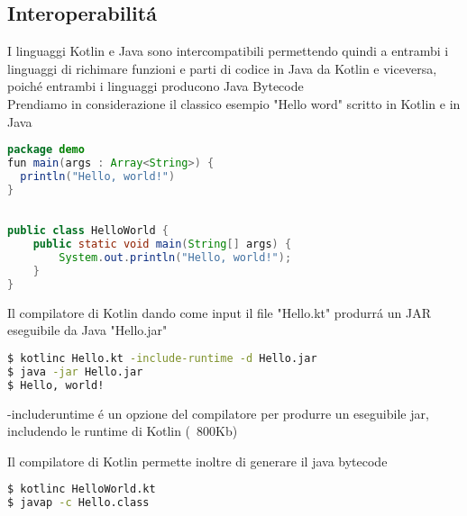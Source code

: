 

\subsection{Interoperabilit\'a}
I linguaggi Kotlin e Java sono intercompatibili permettendo quindi a entrambi i linguaggi di richimare funzioni e parti di codice in Java da Kotlin e viceversa, poich\'e entrambi i linguaggi producono Java Bytecode\\


Prendiamo in considerazione il classico esempio "Hello word" scritto in Kotlin e in Java

\begin{lstlisting}[language=java,caption={Hello.kt in Kotlin}]
package demo
fun main(args : Array<String>) {
  println("Hello, world!")
}
\end{lstlisting}

\begin{lstlisting}[language=java,caption={Hello.java in Java}]

public class HelloWorld {
    public static void main(String[] args) {
        System.out.println("Hello, world!");
    }
}
\end{lstlisting}

Il compilatore di Kotlin dando come input il file "Hello.kt" produrr\'a un JAR eseguibile da Java "Hello.jar"


\begin{lstlisting}[language=bash,caption={Compilatore kotlin}]
$ kotlinc Hello.kt -include-runtime -d Hello.jar
$ java -jar Hello.jar
$ Hello, world!
\end{lstlisting}
 -includeruntime \'e un opzione del compilatore per produrre un eseguibile jar, includendo le runtime di Kotlin (~800Kb)

Il compilatore di Kotlin permette inoltre di generare il java bytecode
\begin{lstlisting}[language=bash,caption={Compilatore kotlin per generare Hello.class}]
$ kotlinc HelloWorld.kt
$ javap -c Hello.class
\end{lstlisting}

%
%



